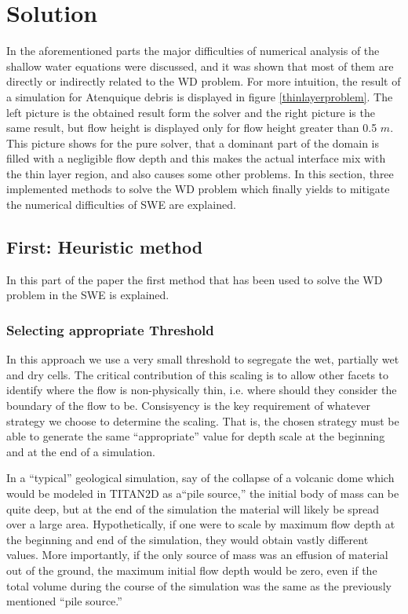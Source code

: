 \documentclass[letterpaper,10pt]{article}
\begin{document}
 

\section{Solution}\label{solution}
In the aforementioned parts the major difficulties of numerical analysis of the shallow water
equations were discussed, and it was shown that most of them are directly or indirectly related to the WD problem.
For more intuition, the result of a simulation for Atenquique debris is displayed in figure \ref{thinlayerproblem}. 
The left picture is the obtained result form the solver and the right picture is the same result, but flow height is displayed 
only for flow height greater than 0.5 $m$. This picture shows for the pure solver, that a dominant part of the 
domain is filled with a negligible flow depth and this makes the actual interface mix with the thin layer region, and 
also causes some other problems. In this section, three implemented methods to solve the WD problem which finally yields to 
mitigate the numerical difficulties of SWE are explained. 


\subsection{First: Heuristic method} \label{Heuristic}
In this part of the paper the first method that has been used to solve the WD problem in the SWE is explained.
\subsubsection{Selecting appropriate Threshold} \label{Threshold}
In this approach we use a very small threshold to segregate the wet, partially wet and dry cells.
The critical contribution of this scaling is to allow other
facets to identify where the flow %
is non-physically thin, i.e. where should they consider the boundary of
the flow to be. Consisyency is the key requirement of whatever strategy we choose to
determine the scaling. That is, the
chosen strategy must be able to generate the same ``appropriate'' value
for depth scale at the beginning and at the end of a simulation.  \newline

In a ``typical'' geological simulation, say of the collapse of a volcanic 
dome which would be modeled in TITAN2D as a``pile source,'' the initial 
body of mass can be quite deep, but at the end of the simulation the 
material will likely be spread over a large area.  Hypothetically, if one 
were to scale by maximum flow depth at the beginning and end of the 
simulation, they would obtain vastly different values.  More importantly, 
if the only source of mass was an effusion of material out of the ground, 
the maximum initial flow depth would be zero, even if the total volume 
during the course of the simulation was the same as the previously 
mentioned ``pile source.''  \newline
\end{document}
